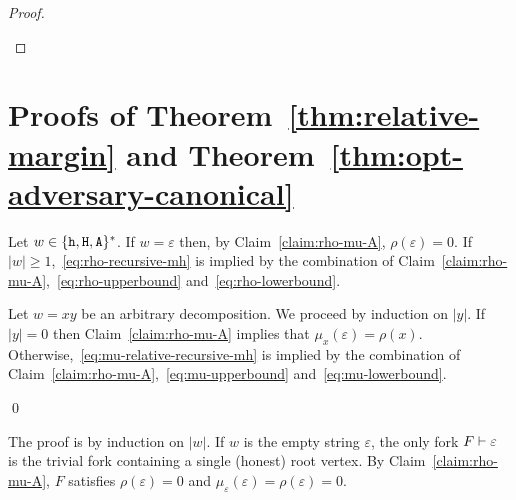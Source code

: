 \begin{proof}
\begin{description}[font=\normalfont\itshape\space]
    \end{description}
\end{proof}






\section{Proofs of Theorem~\ref{thm:relative-margin} and Theorem~\ref{thm:opt-adversary-canonical}}
\label{sec:relative-margin-thm-proof}\label{sec:opt-adversary-thm-proof}



Let $w \in \{\mathtt{h}, \mathtt{H}, \mathtt{A}\}^*$. 
If $w = \varepsilon$ then, by Claim~\ref{claim:rho-mu-A}, 
$\rho(\varepsilon) = 0$. 
If $|w| \geq 1$,~\eqref{eq:rho-recursive-mh} is implied by 
the combination of 
Claim~\ref{claim:rho-mu-A},~\eqref{eq:rho-upperbound} and~\eqref{eq:rho-lowerbound}. 


Let $w = xy$ be an arbitrary decomposition. 
We proceed by induction on $|y|$. 
If $|y| = 0$ then 
Claim~\ref{claim:rho-mu-A} implies that $\mu_x(\varepsilon) = \rho(x)$. 
Otherwise,~\eqref{eq:mu-relative-recursive-mh} 
is implied by the combination of 
Claim~\ref{claim:rho-mu-A},~\eqref{eq:mu-upperbound} and~\eqref{eq:mu-lowerbound}.

\hfill\qed


The proof is by induction on $|w|$. 
If $w$ is the empty string $\varepsilon$, 
the only fork $F \vdash \varepsilon$ is the trivial fork 
containing a single (honest) root vertex. 
By Claim~\ref{claim:rho-mu-A}, 
$F$ satisfies $\rho(\varepsilon) = 0$ 
and 
$\mu_\varepsilon(\varepsilon) = \rho(\varepsilon) = 0$.

